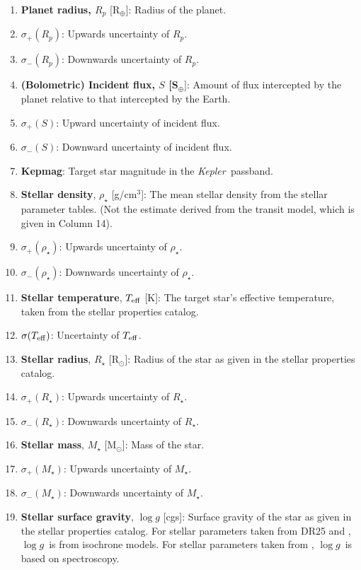 \documentclass{aastex62}
\newcommand{\ik}{{\it Kepler~}}
\newcommand{\teff}{\ensuremath{T_{\rm eff}}}
\newcommand{\logg}{\ensuremath{\log{g}}}
\newcommand{\rstar}{\ensuremath{R_\star}}
\newcommand{\mstar}{\ensuremath{M_\star}}
\newcommand{\rhostar}{\ensuremath{\rho_\star}}
\begin{document}
\begin{enumerate}
   \item \textbf{Planet radius, $R_p$} [R$_\oplus$]:  Radius of the planet.
   \item \textbf{$\sigma_+(R_p)$}: Upwards uncertainty of $R_p$.
   \item \textbf{$\sigma_-(R_p)$}: Downwards uncertainty of $R_p$.
   \item \textbf{(Bolometric) Incident flux, $S$ [S$_\oplus]$}: Amount of flux intercepted by the planet relative to that intercepted by the Earth.
   \item \textbf{$\sigma_+(S)$}: Upward uncertainty of incident flux.
   \item \textbf{$\sigma_-(S)$}: Downward uncertainty of incident flux.
     \item \textbf{Kepmag}: Target star magnitude in the \ik passband.
   \item \textbf{Stellar density}, $\rhostar$ [g/cm$^3$]: The mean stellar density from the stellar parameter tables. (Not the estimate derived from the transit model, which is given in Column 14).  
   \item \textbf{$\sigma_+(\rhostar)$}: Upwards uncertainty of \rhostar.
   \item \textbf{$\sigma_-(\rhostar)$}: Downwards uncertainty of \rhostar.
   \item \textbf{Stellar temperature}, $\teff$ [K]: The target star's effective temperature, taken from the stellar properties catalog.
   \item \textbf{$\sigma(\teff)$}: Uncertainty of \teff.
   \item \textbf{Stellar radius}, $\rstar$ [R$_\odot$]: Radius of the star as given in the stellar properties catalog.
   \item \textbf{$\sigma_+(\rstar)$}:  Upwards uncertainty of \rstar.
   \item \textbf{$\sigma_-(\rstar)$}:  Downwards uncertainty of \rstar.
   \item \textbf{Stellar mass}, $\mstar$ [M$_\odot$]: Mass of the star. %
   \item \textbf{$\sigma_+(\mstar)$}:  Upwards uncertainty of \mstar.
   \item \textbf{$\sigma_-(\mstar)$}:  Downwards uncertainty of \mstar.
     \item \textbf{Stellar surface gravity}, $\logg$ [cgs]: Surface gravity of the star as given in the stellar properties catalog. For stellar parameters taken from DR25 and \citet{Berger:2020a}, \logg\ is from isochrone models.  For stellar parameters taken from \citet{Fulton:2018}, \logg\ is based on spectroscopy. 

\end{enumerate}
\end{document}
